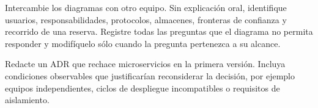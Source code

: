 \begin{ejercicio}[title={Ejercicio 2. Revisión cruzada}]
Intercambie los diagramas con otro equipo. Sin explicación oral, identifique usuarios, responsabilidades, protocolos, almacenes, fronteras de confianza y recorrido de una reserva. Registre todas las preguntas que el diagrama no permita responder y modifíquelo sólo cuando la pregunta pertenezca a su alcance.
\end{ejercicio}

\begin{ejercicio}[title={Ejercicio 3. ADR alternativo}]
Redacte un ADR que rechace microservicios en la primera versión. Incluya condiciones observables que justificarían reconsiderar la decisión, por ejemplo equipos independientes, ciclos de despliegue incompatibles o requisitos de aislamiento.
\end{ejercicio}
